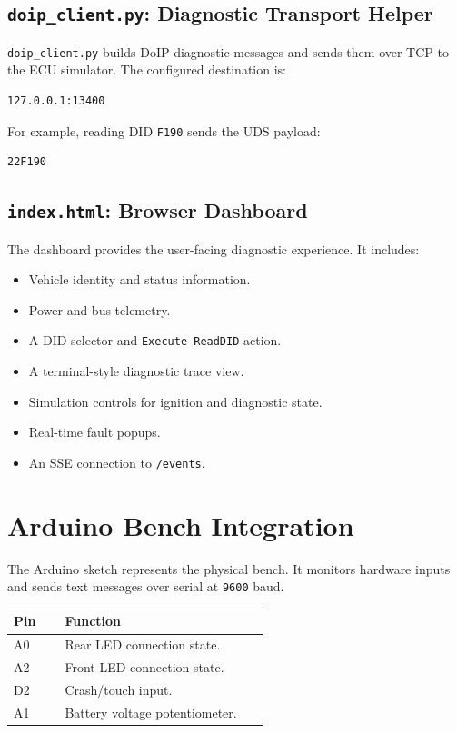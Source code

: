 \documentclass[a4paper,10pt,titlepage,oneside]{article}
\begin{document}
\subsection{\texttt{doip\_client.py}: Diagnostic Transport Helper}

\texttt{doip\_client.py} builds DoIP diagnostic messages and sends them over
TCP to the ECU simulator. The configured destination is:

\begin{lstlisting}
127.0.0.1:13400
\end{lstlisting}

For example, reading DID \texttt{F190} sends the UDS payload:

\begin{lstlisting}
22F190
\end{lstlisting}

\subsection{\texttt{index.html}: Browser Dashboard}

The dashboard provides the user-facing diagnostic experience. It includes:

\begin{itemize}[leftmargin=*]
    \item Vehicle identity and status information.
    \item Power and bus telemetry.
    \item A DID selector and \texttt{Execute ReadDID} action.
    \item A terminal-style diagnostic trace view.
    \item Simulation controls for ignition and diagnostic state.
    \item Real-time fault popups.
    \item An SSE connection to \texttt{/events}.
\end{itemize}

\section{Arduino Bench Integration}

The Arduino sketch represents the physical bench. It monitors hardware inputs
and sends text messages over serial at \texttt{9600} baud.

\begin{longtable}{>{\ttfamily}p{0.18\linewidth} p{0.72\linewidth}}
\textbf{Pin} & \textbf{Function} \\
\hline
A0 & Rear LED connection state. \\
A2 & Front LED connection state. \\
D2 & Crash/touch input. \\
A1 & Battery voltage potentiometer. \\
\end{longtable}
\end{document}
